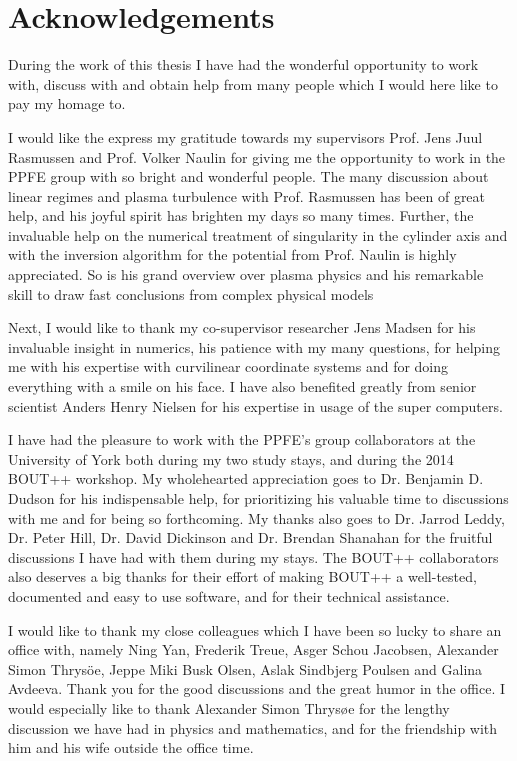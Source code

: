 \chapter*{Acknowledgements}
%
During the work of this thesis I have had the wonderful opportunity to work with, discuss with and obtain help from many people which I would here like to pay my homage to.

I would like the express my gratitude towards my supervisors Prof. Jens Juul Rasmussen and Prof. Volker Naulin for giving me the opportunity to work in the PPFE group with so bright and wonderful people.
The many discussion about linear regimes and plasma turbulence with Prof. Rasmussen has been of great help, and his joyful spirit has brighten my days so many times.
Further, the invaluable help on the numerical treatment of singularity in the cylinder axis and with the inversion algorithm for the potential from Prof. Naulin is highly appreciated.
So is his grand overview over plasma physics and his remarkable skill to draw fast conclusions from complex physical models

Next, I would like to thank my co-supervisor researcher Jens Madsen for his invaluable insight in numerics, his patience with my many questions, for helping me with his expertise with curvilinear coordinate systems and for doing everything with a smile on his face.
I have also benefited greatly from senior scientist Anders Henry Nielsen for his expertise in usage of the super computers.

I have had the pleasure to work with the PPFE's group collaborators at the University of York both during my two study stays, and during the 2014 BOUT++ workshop.
My wholehearted appreciation goes to Dr. Benjamin D. Dudson for his indispensable help, for prioritizing his valuable time to discussions with me and for being so forthcoming.
My thanks also goes to Dr. Jarrod Leddy, Dr. Peter Hill, Dr. David Dickinson and Dr. Brendan Shanahan for the fruitful discussions I have had with them during my stays.
The BOUT++ collaborators also deserves a big thanks for their effort of making BOUT++ a well-tested, documented and easy to use software, and for their technical assistance.

I would like to thank my close colleagues which I have been so lucky to share an office with, namely Ning Yan, Frederik Treue, Asger Schou Jacobsen, Alexander Simon Thrys{\"o}e, Jeppe Miki Busk Olsen, Aslak Sindbjerg Poulsen and Galina Avdeeva. Thank you for the good discussions and the great humor in the office.
I would especially like to thank Alexander Simon Thrys{\o}e for the lengthy discussion we have had in physics and mathematics, and for the friendship with him and his wife outside the office time.

